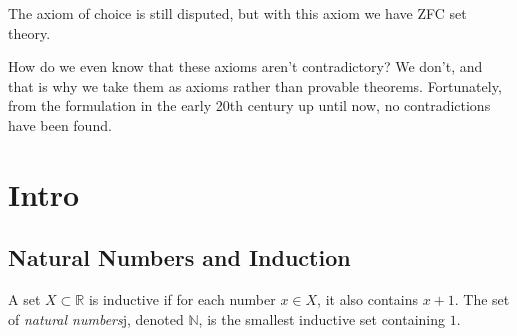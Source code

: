 \documentclass{article}
\begin{document}
    \begin{axiom}
      
    \end{axiom}

    \begin{axiom}
      
    \end{axiom}

    \begin{axiom}
      
    \end{axiom} 

    \begin{axiom}
      
    \end{axiom}

    \begin{axiom}
      
    \end{axiom}

    The axiom of choice is still disputed, but with this axiom we have ZFC set theory. 

    \begin{axiom}
      
    \end{axiom}

    How do we even know that these axioms aren't contradictory? We don't, and that is why we take them as axioms rather than provable theorems. Fortunately, from the formulation in the early 20th century up until now, no contradictions have been found. 

\section{Intro} 

  \subsection{Natural Numbers and Induction}

    \begin{definition}
    A set $X \subset \mathbb{R}$ is inductive if for each number $x \in X$, it also contains $x + 1$. The set of \textit{natural numbers}j, denoted $\mathbb{N}$, is the smallest inductive set containing $1$. 
    \end{definition}
\end{document}
